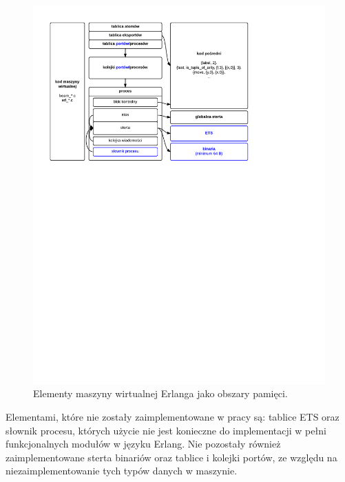 \begin{figure}[h]
\centerline{\includegraphics[scale=1, clip, trim=10mm 165mm 55mm 10mm]{erts_memory}}
\caption{Elementy maszyny wirtualnej Erlanga jako obszary pamięci.}
\label{fig:ertsmemory}
\end{figure}

Elementami, które nie zostały zaimplementowane w pracy są: tablice ETS oraz słownik procesu, których użycie nie jest konieczne do implementacji w pełni funkcjonalnych modułów w języku Erlang. Nie pozostały również zaimplementowane sterta binariów oraz tablice i kolejki portów, ze względu na niezaimplementowanie tych typów danych w maszynie.